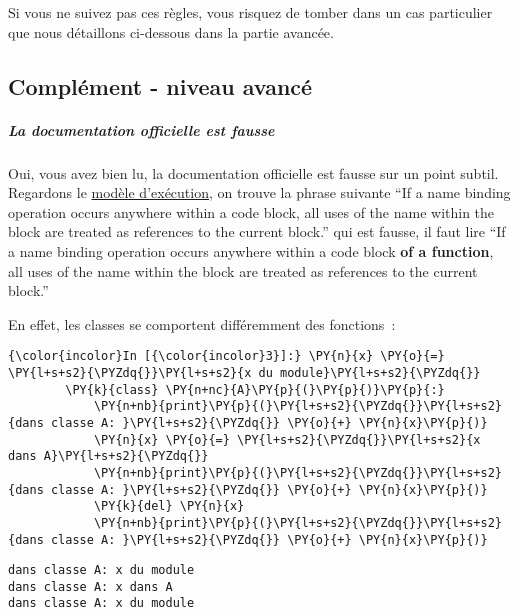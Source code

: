 Si vous ne suivez pas ces règles, vous risquez de tomber dans un cas
particulier que nous détaillons ci-dessous dans la partie avancée.

    \hypertarget{compluxe9ment---niveau-avancuxe9}{%
\subsection{Complément - niveau
avancé}\label{compluxe9ment---niveau-avancuxe9}}

    \hypertarget{la-documentation-officielle-est-fausse}{%
\subparagraph{La documentation officielle est
fausse}\label{la-documentation-officielle-est-fausse}}

    Oui, vous avez bien lu, la documentation officielle est fausse sur un
point subtil. Regardons le
\href{https://docs.python.org/3/reference/executionmodel.html}{modèle
d'exécution}, on trouve la phrase suivante ``If a name binding operation
occurs anywhere within a code block, all uses of the name within the
block are treated as references to the current block.'' qui est fausse,
il faut lire ``If a name binding operation occurs anywhere within a code
block \textbf{of a function}, all uses of the name within the block are
treated as references to the current block.''

En effet, les classes se comportent différemment des fonctions~:

    \begin{Verbatim}[commandchars=\\\{\},frame=single,framerule=0.3mm,rulecolor=\color{cellframecolor}]
{\color{incolor}In [{\color{incolor}3}]:} \PY{n}{x} \PY{o}{=} \PY{l+s+s2}{\PYZdq{}}\PY{l+s+s2}{x du module}\PY{l+s+s2}{\PYZdq{}}
        \PY{k}{class} \PY{n+nc}{A}\PY{p}{(}\PY{p}{)}\PY{p}{:}
            \PY{n+nb}{print}\PY{p}{(}\PY{l+s+s2}{\PYZdq{}}\PY{l+s+s2}{dans classe A: }\PY{l+s+s2}{\PYZdq{}} \PY{o}{+} \PY{n}{x}\PY{p}{)}
            \PY{n}{x} \PY{o}{=} \PY{l+s+s2}{\PYZdq{}}\PY{l+s+s2}{x dans A}\PY{l+s+s2}{\PYZdq{}}
            \PY{n+nb}{print}\PY{p}{(}\PY{l+s+s2}{\PYZdq{}}\PY{l+s+s2}{dans classe A: }\PY{l+s+s2}{\PYZdq{}} \PY{o}{+} \PY{n}{x}\PY{p}{)}
            \PY{k}{del} \PY{n}{x}
            \PY{n+nb}{print}\PY{p}{(}\PY{l+s+s2}{\PYZdq{}}\PY{l+s+s2}{dans classe A: }\PY{l+s+s2}{\PYZdq{}} \PY{o}{+} \PY{n}{x}\PY{p}{)}
\end{Verbatim}


    \begin{Verbatim}[commandchars=\\\{\},frame=single,framerule=0.3mm,rulecolor=\color{cellframecolor}]
dans classe A: x du module
dans classe A: x dans A
dans classe A: x du module
\end{Verbatim}

